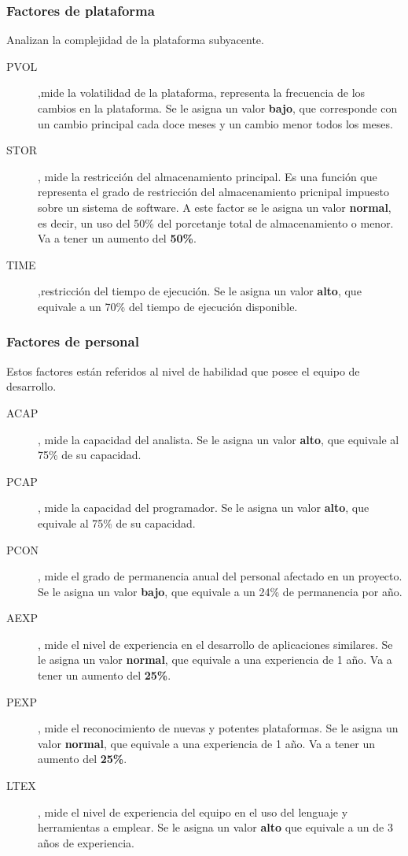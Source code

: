 \documentclass[11pt,a4paper,spanish,twoside]{book}
\begin{document}
\subsubsection{Factores de plataforma}
Analizan la complejidad de la plataforma subyacente.
\begin{description}
\item[PVOL],mide la volatilidad de la plataforma, representa la frecuencia de
  los cambios en la plataforma. Se le asigna un valor \textbf{bajo}, que
  corresponde con un cambio principal cada doce meses y un cambio menor todos
  los meses.

\item[STOR], mide la restricción del almacenamiento principal. Es una función
  que representa el grado de restricción del almacenamiento pricnipal
  impuesto sobre un sistema de software. A este factor se le asigna un valor
  \textbf{normal}, es decir, un uso del 50\% del porcetanje total de
  almacenamiento o menor. Va a tener un aumento del \textbf{50\%}.

\item[TIME],restricción del tiempo de ejecución. Se le asigna un valor
  \textbf{alto}, que equivale a un 70\% del tiempo de ejecución disponible.
\end{description}

\subsubsection{Factores de personal}
Estos factores están referidos al nivel de habilidad que posee el equipo de
desarrollo.
\begin{description}
\item[ACAP], mide la capacidad del analista. Se le asigna un valor
\textbf{alto}, que equivale al 75\% de su capacidad.
\item[PCAP], mide la capacidad del programador. Se le asigna un valor
\textbf{alto}, que equivale al 75\% de su capacidad.
\item[PCON], mide el grado de permanencia anual del personal afectado en un
proyecto. Se le asigna un valor \textbf{bajo}, que equivale a un 24\% de
permanencia por año.
\item[AEXP], mide el nivel de experiencia en el desarrollo de aplicaciones
similares. Se le asigna un valor \textbf{normal}, que equivale a una
experiencia de 1 año. Va a tener un aumento del \textbf{25\%}.
\item[PEXP], mide el reconocimiento de nuevas y potentes plataformas. Se le
asigna un valor \textbf{normal}, que equivale a una experiencia de 1 año. Va
a tener un aumento del \textbf{25\%}.
\item[LTEX], mide el nivel de experiencia del equipo en el uso del lenguaje y
herramientas a emplear. Se le asigna un valor \textbf{alto} que equivale a un
de 3 años de experiencia.
\end{description}
\end{document}
